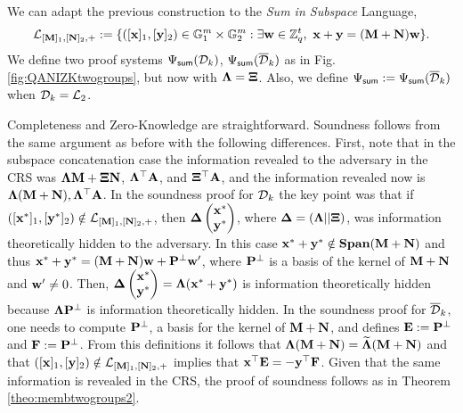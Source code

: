 We can adapt the previous construction to the \textit{Sum in Subspace} Language, 
 $$\mathcal{L}_{[\mathbf{{M}}]_1,[\mathbf{{N}}]_2,+}:=\{ ([\mathbf{x}]_1,[\mathbf{y}]_2) \in \mathbb{G}_1^{m} \times \mathbb{G}_2^{m} :  \exists \mathbf{w} \in \mathbb{Z}_q^{t}, \  \mathbf{x}+\mathbf{y}=(\mathbf{{M}}+\mathbf{{N}}) \mathbf{w}\}.$$
 We define two proof systems $\Psi_{\mathsf{sum}}(\mathcal{D}_k)$, $\Psi_{\mathsf{sum}}(\overline{\mathcal{D}}_k)$ as in Fig. \ref{fig:QANIZKtwogroups}, but now 
with $\mathbf{{\Lambda}}=\mathbf{{\Xi}}$. Also, we define $\Psi_{\mathsf{sum}}:=\Psi_{\mathsf{sum}}(\overline{\mathcal{D}}_k)$ when $\mathcal{D}_k=\mathcal{L}_2$.

Completeness and Zero-Knowledge are straightforward. Soundness follows from the same argument as before with the following differences. First, note that in the subspace concatenation case the information revealed to the adversary in the CRS was $\mathbf{{\Lambda}}\mathbf{{M}}+\mathbf{{\Xi}}\mathbf{{N}}$, $\mathbf{{\Lambda}}^\top\mathbf{{A}}$, and $\mathbf{{\Xi}}^\top\mathbf{{A}}$, and the information revealed now is $\mathbf{{\Lambda}}(\mathbf{{M}}+\mathbf{{N}}),\mathbf{{\Lambda}}^{\top}\mathbf{{A}}$. In the soundness proof for $\mathcal{D}_k$ the key point was that if $([\mathbf{x}^*]_1,[\mathbf{y}^*]_2)\notin\mathcal{L}_{[\mathbf{{M}}]_1,[\mathbf{{N}}]_2,+}$, then $\mathbf{{\Delta}}\left(\begin{matrix}\mathbf{x}^*\\\mathbf{y}^*\end{matrix}\right)$, where $\mathbf{{\Delta}}=(\mathbf{{\Lambda}}||\mathbf{{\Xi}})$, was information theoretically hidden to the adversary. In this case $\mathbf{x}^*+\mathbf{y}^*\notin\mathbf{Span}(\mathbf{{M}}+\mathbf{{N}})$ and thus $\mathbf{x}^*+\mathbf{y}^*=(\mathbf{{M}}+\mathbf{{N}})\mathbf{w}+\mathbf{{P}}^\bot\mathbf{w}'$, where $\mathbf{{P}}^\bot$ is a basis of the kernel of $\mathbf{{M}}+\mathbf{{N}}$ and $\mathbf{w}'\neq 0$. Then, $\mathbf{{\Delta}}\left(\begin{matrix}\mathbf{x}^*\\\mathbf{y}^*\end{matrix}\right)=\mathbf{{\Lambda}}(\mathbf{x}^*+\mathbf{y}^*)$ is information theoretically hidden because $\mathbf{{\Lambda}}\mathbf{{P}}^\bot$ is information theoretically hidden. In the soundness proof for $\overline{\mathcal{D}}_k$, one needs to compute $\mathbf{{P}}^\bot$, a basis for the kernel of $\mathbf{{M}}+\mathbf{{N}}$, and defines $\mathbf{{E}}:=\mathbf{{P}}^\bot$ and $\mathbf{{F}}:=\mathbf{{P}}^\bot$. From this definitions it follows that $\mathbf{{\Lambda}}(\mathbf{{M}}+\mathbf{{N}})=\widetilde{\mathbf{{\Lambda}}}(\mathbf{{M}}+\mathbf{{N}})$ and that $([\mathbf{x}]_1,[\mathbf{y}]_2)\notin\mathcal{L}_{[\mathbf{{M}}]_1,[\mathbf{{N}}]_2,+}$ implies that $\mathbf{x}^\top\mathbf{{E}}=-\mathbf{y}^\top\mathbf{{F}}$. Given that the same information is revealed in the CRS, the proof of soundness follows as in Theorem \ref{theo:membtwogroups2}.
